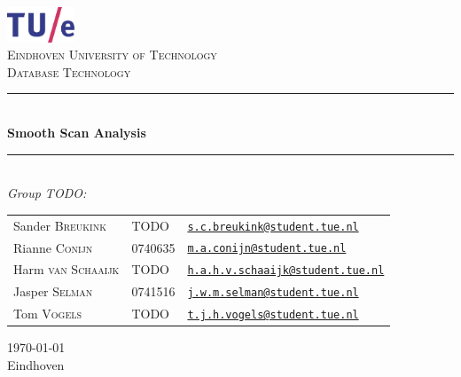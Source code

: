 \documentclass[a4paper,11pt,titlepage]{article}
\author{
	Nicky Advokaat (0740567) - \texttt{n.advokaat@student.tue.nl}
	\and
	Robbert Jongeling (0747896) - \texttt{r.m.jongeling@student.tue.nl}
	\and
	Bram Kohl (0746107) - \texttt{b.j.e.kohl@student.tue.nl}
	\and
	Jasper Selman (0741516) - \texttt{j.w.m.selman@student.tue.nl}
	\and
	Ramon de Vaan (0758873) - \texttt{r.d.vaan@student.tue.nl}
}
\date{\today}
\newcommand{\HRule}{\rule{\linewidth}{0.5mm}}
\newcommand{\uni}{Eindhoven University of Technology}
\newcommand{\vak}{Database Technology}
\newcommand{\essaytitle}{Smooth Scan Analysis}
\newcommand{\stad}{Eindhoven}
\begin{document}
	\begin{center}

		\includegraphics[width=0.15\textwidth]{images/tuelogo}\\[1cm]

		\textsc{\LARGE \uni}\\[1.6cm]


        \textsc{\LARGE \vak}\\[0.5cm]

\HRule \\[0.4cm]
{ \huge \bfseries \essaytitle}\\[0.4cm]

\HRule \\[1.5cm]

	\emph{Group TODO:}\\
    \begin{tabular}{l l l}
	Sander \textsc{Breukink} & TODO & \href{mailto:s.c.breukink@student.tue.nl}{\texttt{s.c.breukink@student.tue.nl}}\\
	Rianne \textsc{Conijn} & 0740635 & \href{mailto:m.a.conijn@student.tue.nl}{\texttt{m.a.conijn@student.tue.nl}}\\
	Harm \textsc{van Schaaijk} & TODO & \href{mailto:h.a.h.v.schaaijk@student.tue.nl}{\texttt{h.a.h.v.schaaijk@student.tue.nl}}\\
	Jasper \textsc{Selman} & 0741516 & \href{mailto:j.w.m.selman@student.tue.nl}{\texttt{j.w.m.selman@student.tue.nl}}\\
	Tom \textsc{Vogels} & TODO & \href{mailto:t.j.h.vogels@student.tue.nl}{\texttt{t.j.h.vogels@student.tue.nl}}
    \end{tabular}
		\vfill

{\large \today} \\
\stad

	\end{center}

    \newpage
\end{document}
